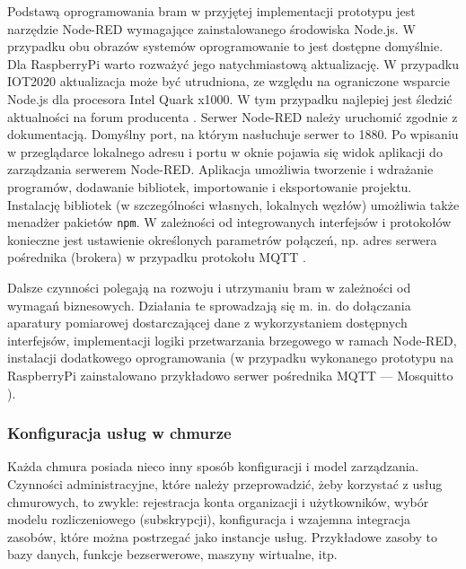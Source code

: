 \documentclass[a4paper, 12pt, twoside]{article}
\begin{document}
Podstawą oprogramowania bram w przyjętej implementacji prototypu jest
narzędzie Node-RED wymagające zainstalowanego środowiska Node.js. W przypadku
obu obrazów systemów oprogramowanie to jest dostępne domyślnie. Dla RaspberryPi
warto rozważyć jego natychmiastową aktualizację. W przypadku IOT2020 aktualizacja
może być utrudniona, ze względu na ograniczone wsparcie Node.js dla procesora
Intel Quark x1000. W tym przypadku najlepiej jest śledzić aktualności na
forum producenta \cite{simatic-iot-forum}. 
Serwer Node-RED należy uruchomić zgodnie z dokumentacją. Domyślny port, na
którym nasłuchuje serwer to 1880. Po wpisaniu w przeglądarce lokalnego adresu i portu
w oknie pojawia się widok aplikacji do zarządzania serwerem Node-RED. Aplikacja
umożliwia tworzenie i wdrażanie programów, dodawanie bibliotek, importowanie i eksportowanie projektu.
Instalację bibliotek (w szczególności własnych, lokalnych węzłów) umożliwia także menadżer pakietów \texttt{npm}.
W zależności od integrowanych interfejsów i protokołów konieczne jest ustawienie
określonych parametrów połączeń, np. adres serwera pośrednika (brokera) w przypadku protokołu MQTT
\cite{node-red-doc}.

Dalsze czynności polegają na rozwoju i utrzymaniu bram w zależności od wymagań
biznesowych. Działania te sprowadzają się m. in. do dołączania aparatury pomiarowej dostarczającej dane
z wykorzystaniem dostępnych interfejsów, implementacji logiki przetwarzania
brzegowego w ramach Node-RED, instalacji dodatkowego oprogramowania
(w przypadku wykonanego prototypu na RaspberryPi zainstalowano przykładowo 
serwer pośrednika MQTT --- Mosquitto \cite{mosquitto-doc}).


\subsubsection{Konfiguracja usług w chmurze}

Każda chmura posiada nieco inny sposób konfiguracji i model zarządzania.
Czynności administracyjne, które należy przeprowadzić, żeby korzystać z usług
chmurowych, to zwykle: rejestracja konta organizacji i użytkowników,
wybór modelu rozliczeniowego (subskrypcji), konfiguracja i wzajemna
integracja zasobów, które można postrzegać jako instancje usług. Przykładowe zasoby
to bazy danych, funkcje bezserwerowe, maszyny wirtualne, itp.
\end{document}
